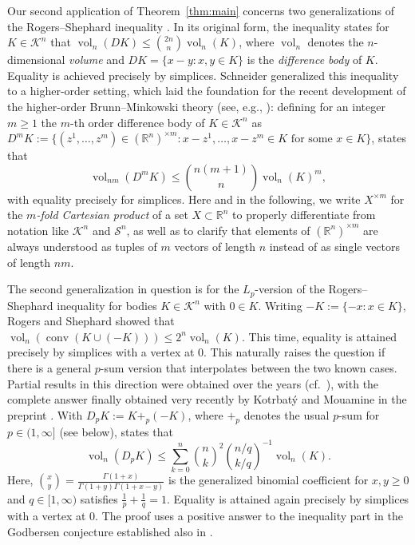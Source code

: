 \documentclass{amsart}
\newcommand{\cemph}[1]{\emph{\color{red}#1}}
\newcommand\R{\mathbb{R}}
\newcommand\CK{\mathcal{K}}
\DeclareMathOperator{\conv}{conv}
\DeclareMathOperator{\vol}{vol}
\newcommand{\simplex}[1]{\mathcal{S}^{#1}}
\newcommand{\cartesian}[2]{#1^{\times #2}}
\begin{document}
Our second application of Theorem~\ref{thm:main} concerns two generalizations of the Rogers--Shephard inequality \cite{1957:RogersShephard}.
In its original form, the inequality states for $K \in \CK^n$ that $\vol_n(DK) \leq \binom{2n}{n} \vol_n(K)$, where $\vol_n$ denotes the $n$-dimensional \cemph{volume} and $DK = \{ x-y : x,y \in K \}$ is the \cemph{difference body} of $K$.
Equality is achieved precisely by simplices.
Schneider \cite{1970:Schneider} generalized this inequality to a higher-order setting,
which laid the foundation for the recent development of the higher-order Brunn--Minkowski theory (see, e.g., \cite{2025:HaddadLangharstLivshytsPutterman,2025+1:HaddadLangharstPuttermanRoysdonYe,2025+2:HaddadLangharstPuttermanRoysdonYe,2025:Langharst,2024:LangharstMarinSolaUlivelli,2024:LangharstXi,2026:ZhouWuYe,2025:ZhouYeZhang}): defining for an integer $m \geq 1$ the $m$-th order difference body of $K \in \CK^n$ as
$D^m K := \{ (z^1, \dots, z^m) \in \cartesian{(\R^n)}{m} : x - z^1, \dots, x - z^m \in K \text{ for some } x \in K \}$,
\cite[Satz~$2$]{1970:Schneider} states that
\begin{equation} \label{eq:Schneider_RS}
    \vol_{nm}(D^m K)
    \leq \binom{n (m+1)}{n} \vol_n(K)^m,
\end{equation}
with equality precisely for simplices.
Here and in the following, we write $\cartesian{X}{m}$ for the \cemph{$m$-fold Cartesian product} of a set $X \subset \R^n$ to properly differentiate from notation like $\CK^n$ and $\simplex{n}$, as well as to clarify that elements of $\cartesian{(\R^n)}{m}$ are always understood as tuples of $m$ vectors of length $n$ instead of as single vectors of length $nm$.

The second generalization in question is for the $L_p$-version of the Rogers--Shephard inequality for bodies $K \in \CK^n$ with $0 \in K$.
Writing $-K := \{-x : x \in K\}$,
Rogers and Shephard \cite[Theorem~$3$]{1958:RogersShephard}
showed that $\vol_n(\conv(K \cup (-K))) \leq 2^n \vol_n(K)$.
This time, equality is attained precisely by simplices with a vertex at $0$.
This naturally raises the question if there is a general $p$-sum version that interpolates between the two known cases.
Partial results in this direction were obtained over the years (cf.~\cite{2008:BianchiniColesanti,2026:FradeliziManuiMeyerNdiaye,2026:ManuiNdiayeZvavitch}),
with the complete answer finally obtained very recently by Kotrbat\'y and Mouamine in the preprint \cite{2026:KotrbatyMouamine}.
With $D_p K := K +_p (-K)$, where $+_p$ denotes the usual $p$-sum for $p \in (1,\infty]$ (see below), \cite[Theorem~$1.2$]{2026:KotrbatyMouamine} states that
\begin{equation} \label{eq:Lp_RS}
    \vol_n(D_p K)
    \leq \sum_{k = 0}^n \binom{n}{k}^2 \binom{n/q}{k/q}^{-1} \vol_n(K).
\end{equation}
Here, $\binom{x}{y} = \frac{\Gamma(1+x)}{\Gamma(1+y) \Gamma(1+x-y)}$ is the generalized binomial coefficient for $x,y \geq 0$ and $q \in [1,\infty)$ satisfies $\frac{1}{p} + \frac{1}{q} = 1$.
Equality is attained again precisely by simplices with a vertex at $0$.
The proof uses a positive answer to the inequality part in the Godbersen conjecture established also in \cite{2026:KotrbatyMouamine}.
\end{document}

